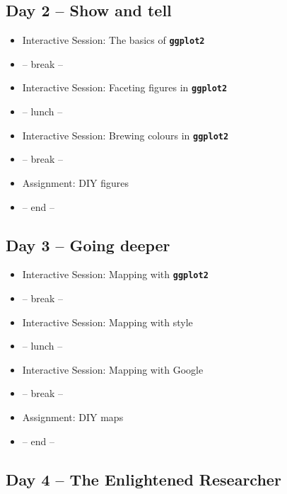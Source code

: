 \documentclass[
]{book}
\providecommand{\tightlist}{%
  \setlength{\itemsep}{0pt}\setlength{\parskip}{0pt}}
\begin{document}
\hypertarget{day-2-show-and-tell}{%
\subsection*{Day 2 -- Show and tell}\label{day-2-show-and-tell}}

\begin{itemize}
\tightlist
\item
  Interactive Session: The basics of \textbf{\texttt{ggplot2}}
\item
  -- break --
\item
  Interactive Session: Faceting figures in \textbf{\texttt{ggplot2}}
\item
  -- lunch --
\item
  Interactive Session: Brewing colours in \textbf{\texttt{ggplot2}}
\item
  -- break --
\item
  Assignment: DIY figures
\item
  -- end --
\end{itemize}

\hypertarget{day-3-going-deeper}{%
\subsection*{Day 3 -- Going deeper}\label{day-3-going-deeper}}

\begin{itemize}
\tightlist
\item
  Interactive Session: Mapping with \textbf{\texttt{ggplot2}}
\item
  -- break --
\item
  Interactive Session: Mapping with style
\item
  -- lunch --
\item
  Interactive Session: Mapping with Google
\item
  -- break --
\item
  Assignment: DIY maps
\item
  -- end --
\end{itemize}

\hypertarget{day-4-the-enlightened-researcher}{%
\subsection*{Day 4 -- The Enlightened Researcher}\label{day-4-the-enlightened-researcher}}
\end{document}
